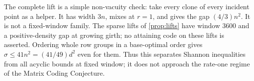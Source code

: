 The complete lift is a simple non-vacuity check: take every clone of every incident point as a helper. It has width
$3n$, mixes at $r=1$, and gives the gap $(4/3)n^2$. It is not a fixed-window family. The sparse lifts of
\cref{prop:lifts} have window $3600$ and a positive-density gap at growing girth; no attaining code on these lifts
is asserted. Ordering whole row groups in a base-optimal order gives $\sigma\le41n^2=(41/49)d^2$ even for them.
Thus this separates Shannon inequalities from all acyclic bounds at fixed window; it does not approach the
rate-one regime of the Matrix Coding Conjecture.
